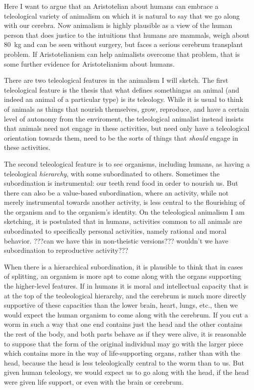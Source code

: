 Here I want to argue that an Aristotelian about humans can embrace a teleological variety of animalism on which it is natural to say that 
we go along with our cerebra. Now animalism is highly plausible as 
a view of the human person that does justice to the intuitions that humans are mammals, weigh about 80~kg and can be seen 
without surgery, but faces a serious cerebrum transplant problem. If Aristotelianism can help animalists overcome that problem,
that is some further evidence for Aristotelianism about humans.

There are two teleological features in the animalism I will sketch. The first teleological feature is the thesis 
that what defines somethingas an animal (and indeed an animal of a particular type) is its teleology. While it is usual to 
think of animals as things that nourish themselves, grow, reproduce, and have a certain level of autonomy from the enviroment, 
the teleological animalist instead insists that animals need not engage in these activities, but need only have a teleological
orientation towards them, need to be the sorts of things that \textit{should} engage in these activities. 

The second teleological feature is to see organisms, including humans, as having a teleological \textit{hierarchy}, with some
\tele{} subordinated to others. Sometimes the subordination is instrumental: our teeth rend food in order to nourish us. 
But there can also be a value-based subordination, where an activity, while not merely instrumental towards another activity, 
is less central to the flourishing of the organism and to the organism's identity. On the teleological animalism I am sketching,
it is postulated that in humans, activities common to all animals are subordinated to specifically personal activities, namely 
rational and moral behavior. ???can we have this in non-theistic versions??? wouldn't we have subordination to reproductive
activity???

When there is a hierarchical subordination, it is plausible to think that in cases of splitting, an organism is more apt
to come along with the organs supporting the higher-level features. If in humans it is moral and intellectual capacity 
that is at the top of the teoleological hierarchy, and the cerebrum is much more directly supportive of these capacities
than the lower brain, heart, lungs, etc., then we would expect the human organism to come along with the cerebrum. If you
cut a worm in such a way that one end contains just the head and the other contains the rest of the body, and both parts
behave as if they were alive, it is reasonable to suppose that the form of the original individual may go with the larger
piece which contains more in the way of life-supporting organs, rather than with the head, because the head is less 
teleologically central to the worm than to us. But given human teleology, we would expect us to go along with the head,
if the head were given life support, or even with the brain or cerebrum.

